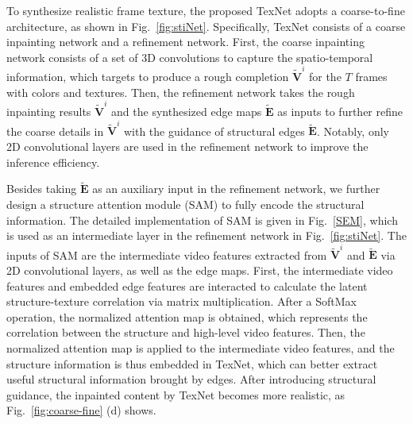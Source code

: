 To synthesize realistic frame texture, the proposed TexNet adopts a coarse-to-fine architecture, as shown in Fig.~\ref{fig:stiNet}.
Specifically, TexNet consists of a coarse inpainting network and a refinement network.
%
First, the coarse inpainting network consists of a set of 3D convolutions to capture the spatio-temporal information, which targets to produce a rough completion $\boldsymbol{\widetilde{V}}^i$ for the $T$ frames with colors and textures.
Then, the refinement network takes the rough inpainting results $\boldsymbol{\widetilde{V}}^i$ and the synthesized edge maps $\boldsymbol{\widetilde{E}}$ as inputs to further refine the coarse details in $\boldsymbol{\widetilde{V}}^i$ with the guidance of structural edges $\boldsymbol{\widetilde{E}}$.
Notably, only 2D convolutional layers are used in the refinement network to improve the inference efficiency. 

Besides taking $\boldsymbol{\widetilde{E}}$ as an auxiliary input in the refinement network, we further design a structure attention module (SAM) to fully encode the structural information.
The detailed implementation of SAM is given in Fig.~\ref{SEM}, which is used as an intermediate layer in the refinement network in Fig.~\ref{fig:stiNet}.
The inputs of SAM are the intermediate video features extracted from $\boldsymbol{\widetilde{V}}^i$ and $\boldsymbol{\widetilde{E}}$ via 2D convolutional layers, as well as
the edge maps. %
First, the intermediate video features and embedded edge features are interacted to calculate the latent structure-texture correlation via matrix multiplication. 
After a SoftMax operation, the normalized attention map is obtained, which represents the correlation between the structure and high-level video features.
%
Then, the normalized attention map is applied to the intermediate video features, and the structure information is thus embedded in TexNet, which can better extract useful structural information brought by edges.
After introducing structural guidance, the inpainted content by TexNet becomes more realistic, as Fig.~\ref{fig:coarse-fine} (d) shows.

